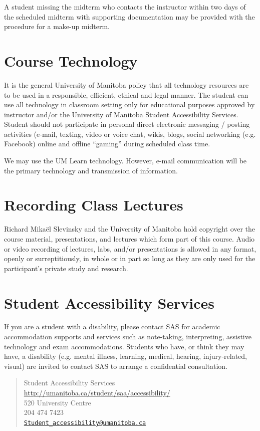 \documentclass[12pt]{article}
\begin{document}
A student missing the midterm who contacts the instructor within two days of the scheduled midterm with supporting documentation may be provided with the procedure for a make-up midterm.

\section{Course Technology}

It is the general University of Manitoba policy that all technology resources are to be used in a responsible, efficient, ethical and legal manner. The student can use all technology in classroom setting only for educational purposes approved by instructor and/or the University of Manitoba Student Accessibility Services. Student should not participate in personal direct electronic messaging / posting activities (e-mail, texting, video or voice chat, wikis, blogs, social networking (e.g. Facebook) online and offline ``gaming'' during scheduled class time.

We may use the UM Learn technology. However, e-mail communication will be the primary technology and transmission of information.

\section{Recording Class Lectures}

Richard Mika\"el Slevinsky and the University of Manitoba hold copyright over the course material, presentations, and lectures which form part of this course.  Audio or video recording of lectures, labs, and/or presentations is allowed in any format, openly or surreptitiously, in whole or in part so long as they are only used for the participant's private study and research.

\section{Student Accessibility Services}

If you are a student with a disability, please contact SAS for academic accommodation supports and services such as note-taking, interpreting, assistive technology and exam accommodations. Students who have, or think they may have, a disability (e.g. mental illness, learning, medical, hearing, injury-related, visual) are invited to contact SAS to arrange a confidential consultation. 

\begin{quote}
Student Accessibility Services \url{http://umanitoba.ca/student/saa/accessibility/} \\
520 University Centre \\
204 474 7423 \\
\href{mailto:Student_accessibility@umanitoba.ca}{\texttt{Student\_accessibility@umanitoba.ca}}
\end{quote}
\end{document}
